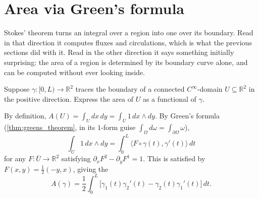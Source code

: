 
\section{Area via Green's formula}
\label{sec:area_via_green}

Stokes' theorem turns an integral over a region into one over its boundary. Read in that
direction it computes fluxes and circulations, which is what the previous sections did with it.
Read in the other direction it says something initially surprising: the area of a region is
determined by its boundary curve alone, and can be computed without ever looking inside.

\begin{example}
\label{ex:area_boundary_functional}
Suppose $\gamma : [0,L) \to \mathbb{R}^2$ traces the boundary of a connected $C^\infty$-domain
$U \subseteq \mathbb{R}^2$ in the positive direction. Express the area of $U$ as a functional
of $\gamma$.

\medskip
By definition, $A(U) = \int_U dx\,dy = \int_U 1\,dx\wedge dy$. By Green's formula
(\cref{thm:greens_theorem}, in its $1$-form guise $\int_\Omega d\omega =
\int_{\partial\Omega}\omega$),
\[\int_U 1\,dx\wedge dy = \int_0^L \langle F\circ\gamma(t),\gamma'(t)\rangle\,dt\]
for any $F : \overline U \to \mathbb{R}^2$ satisfying $\partial_xF^2 - \partial_yF^1 = 1$. This
is satisfied by $F(x,y) = \tfrac12(-y,x)$, giving the 
\[A(\gamma) = \frac12\int_0^L \big[\gamma_1(t)\gamma_2'(t) - \gamma_2(t)\gamma_1'(t)\big]\,dt.\]
\end{example}

